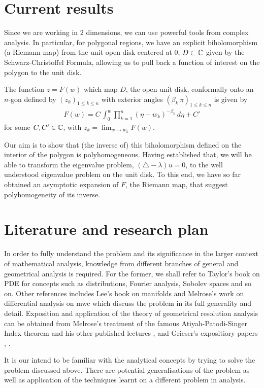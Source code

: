 \documentclass{article}
\begin{document}
\section{Current results} 
Since we are working in 2 dimensions, we can use powerful tools from complex analysis. In particular, for polygonal regions, we have an explicit biholomorphism (a Riemann map) from the unit open disk centered at 0, $D \subset \mathbb C$ given by the Schwarz-Christoffel Formula, allowing us to pull back a function of interest on the polygon to the unit disk. 
\begin{theorem}
The function $ z = F(w)$ which map $D$, the open unit disk, conformally onto an $n$-gon defined by  $(z_k)_{1 \leq k \leq n}$ with exterior angles $(\beta_k \, \pi)_{1 \leq k \leq n}$ is given by 
\begin{align} \label{eq: schwarz-christoffel formula}
F(w) = C \, \int_0^w \prod_{k = 1}^n (\eta - w_k)^{- \beta_k} \, d\eta + C'
\end{align}
for some $C, C' \in \mathbb C$, with $z_k = \lim_{w \to w_k} F(w)$. 
\end{theorem}
Our aim is to show that (the inverse of) this biholomorphism defined on the interior of the polygon is polyhomogeneous. Having established that, we will be able to transform the eigenvalue problem, $(\triangle - \lambda) u = 0$, to the well understood eigenvalue problem on the unit disk.  To this end, we have so far obtained an asymptotic expansion of $F$, the Riemann map, that suggest polyhomogeneity of its inverse. 

\section{Literature and research plan} 
In order to fully understand the problem and its significance in the larger context of mathematical analysis, knowledge from different branches of general and geometrical analysis is required. For the former, we shall refer to Taylor's book on PDE \cite{taylor_pde} for concepts such as distributions, Fourier analysis, Sobolev spaces and so on. Other references includes Lee's book on manifolds \cite{LeeSM} and Melrose's work on differential analysis on mwc \cite{rbm_daomwc} which discuss the problem in its full generality and detail. Exposition and application of the theory of geometrical resolution analysis can be obtained from Melrose's treatment of the famous Atiyah-Patodi-Singer Index theorem \cite{rbm_aps} and his other published lectures \cite{rbm_geo_analysis}, \cite{rbm_intro_microlocal} and Grieser's expositiory papers \cite{grieser_scales_blow_up}, \cite{grieser_b_calculus}. 

It is our intend to be familiar with the analytical concepts by trying to solve the problem discussed above. There are potential generalisations of the problem as well as application of the techniques learnt on a different problem in analysis. 




\pagebreak 


\end{document}
